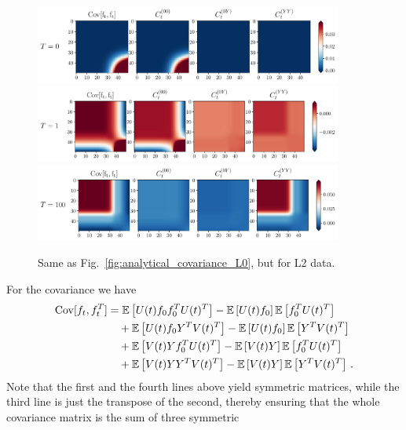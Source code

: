  \begin{figure}[ht!]
    \centering
    \includegraphics[width=0.90\textwidth]{plots/analytical_solution/covariance_ft_0_L2.pdf}
    \includegraphics[width=0.90\textwidth]{plots/analytical_solution/covariance_ft_1_L2.pdf}
    \includegraphics[width=0.90\textwidth]{plots/analytical_solution/covariance_ft_100_L2.pdf}
    \caption{Same as Fig.~\ref{fig:analytical_covariance_L0}, but for L2 data.}
    \label{fig:analytical_covariance_L2}
  \end{figure}
For the covariance we have 
\begin{align}
    \mathrm{Cov}[f_t,f_t^T]
        &= \mathbb{E}\left[U(t) f_0 f_0^T U(t)^T\right] 
            - \mathbb{E}\left[U(t) f_0\right] \mathbb{E}\left[f_0^T U(t)^T\right]  \nonumber \\
        &\quad + \mathbb{E}\left[U(t) f_0 Y^T V(t)^T\right] 
            - \mathbb{E}\left[U(t) f_0\right] \mathbb{E}\left[Y^T V(t)^T\right] \nonumber \\
        &\quad + \mathbb{E}\left[V(t) Y f_0^T U(t)^T\right]
            - \mathbb{E}\left[V(t) Y\right] \mathbb{E}\left[f_0^T U(t)^T\right] \nonumber \\
    \label{eq:CovAtT}
        &\quad + \mathbb{E}\left[V(t) Y Y^T V(t)^T\right]
            - \mathbb{E}\left[V(t) Y\right] \mathbb{E}\left[Y^T V(t)^T\right] \, .
\end{align}
Note that the first and the fourth lines above yield symmetric matrices, while the third line is just the 
transpose of the second, thereby ensuring that the whole covariance matrix is the sum of three symmetric 
